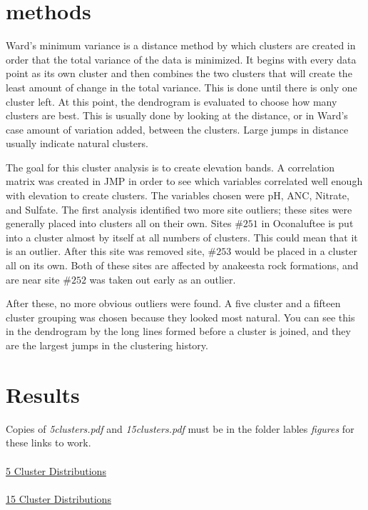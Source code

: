 \documentclass[11pt]{article} %
\begin{document}
\section{methods}
Ward’s minimum variance is a distance method by which clusters are created in order that the total variance of the data is minimized.  It begins with every data point as its own cluster and then combines the two clusters that will create the least amount of change in the total variance.  This is done until there is only one cluster left.  At this point, the dendrogram is evaluated to choose how many clusters are best.  This is usually done by looking at the distance, or in Ward’s case amount of variation added, between the clusters.  Large jumps in distance usually indicate natural clusters.

The goal for this cluster analysis is to create elevation bands.  A correlation matrix was created in JMP in order to see which variables correlated well enough with elevation to create clusters.  The variables chosen were pH, ANC, Nitrate, and Sulfate.   The first analysis identified two more site outliers; these sites were generally placed into clusters all on their own.  Sites $\#251$ in Oconaluftee is put into a cluster almost by itself at all numbers of clusters.  This could mean that it is an outlier.  After this site was removed site, $\#253$ would be placed in a cluster all on its own.  Both of these sites are affected by anakeesta rock formations, and are near site $\#252$ was taken out early as an outlier.

After these, no more obvious outliers were found.  A five cluster and a fifteen cluster grouping was chosen because they looked most natural.  You can see this in the dendrogram by the long lines formed before a cluster is joined, and they are the largest jumps in the clustering history.

\section{Results}%
Copies of  {\it 5clusters.pdf} and {\it 15clusters.pdf} must be in the folder lables {\it figures} for these links to work.\\
\\
\href{run:figures/5clusters.pdf}{5 Cluster Distributions}\\
\\ 
\href{run:figures/15clusters.pdf}{15 Cluster Distributions}\\
\end{document}
